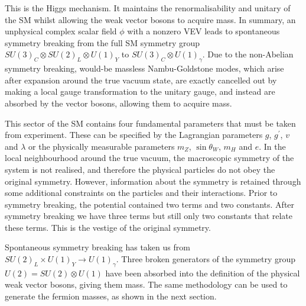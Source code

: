 This is the Higgs mechanism.
It maintains the renormalisability and unitary of the SM whilst allowing the weak vector bosons to acquire mass.
In summary, an unphysical complex scalar field $\phi$ with a nonzero VEV leads to spontaneous symmetry breaking from the full SM symmetry group $SU(3)_C \otimes SU(2)_L \otimes U(1)_Y$ to $SU(3)_C \otimes U(1)_\gamma$.
Due to the non-Abelian symmetry breaking, would\nobreakdash-be massless Nambu-Goldstone modes, which arise after expansion around the true vacuum state, are exactly cancelled out by making a local gauge transformation to the unitary gauge, and instead are absorbed by the vector bosons, allowing them to acquire mass.

This sector of the SM contains four fundamental parameters that must be taken from experiment.
These can be specified by the Lagrangian parameters $g$, $g^\prime$, $v$ and $\lambda$ or the physically measurable parameters $m_Z$, $\sin\theta_W$, $m_H$ and $e$.
In the local neighbourhood around the true vacuum, the macroscopic symmetry of the system is not realised, and therefore the physical particles do not obey the original symmetry. 
However, information about the symmetry is retained through some additional constraints on the particles and their interactions.
Prior to symmetry breaking, the potential contained two terms and two constants. After symmetry breaking we have three terms but still only two constants that relate these terms. This is the vestige of the original symmetry. %

Spontaneous symmetry breaking has taken us from $SU(2)_L \times U(1)_Y \rightarrow U(1)_{\gamma}$.
Three broken generators of the symmetry group $U(2) = SU(2) \otimes U(1)$ have been absorbed into the definition of the physical weak vector bosons, giving them mass.
The same methodology can be used to generate the fermion masses, as shown in the next section. 






